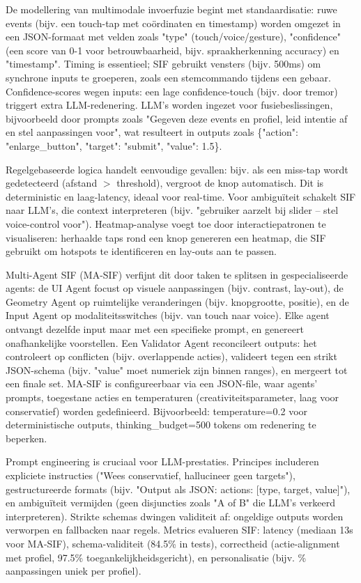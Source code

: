 \documentclass[openany]{book}
\begin{document}
De modellering van multimodale invoerfuzie begint met standaardisatie: ruwe events (bijv. een touch-tap met coördinaten en timestamp) worden omgezet in een JSON-formaat met velden zoals "type" (touch/voice/gesture), "confidence" (een score van 0-1 voor betrouwbaarheid, bijv. spraakherkenning accuracy) en "timestamp". Timing is essentieel; SIF gebruikt vensters (bijv. 500ms) om synchrone inputs te groeperen, zoals een stemcommando tijdens een gebaar. Confidence-scores wegen inputs: een lage confidence-touch (bijv. door tremor) triggert extra LLM-redenering. LLM's worden ingezet voor fusiebeslissingen, bijvoorbeeld door prompts zoals "Gegeven deze events en profiel, leid intentie af en stel aanpassingen voor", wat resulteert in outputs zoals \{"action": "enlarge\_button", "target": "submit", "value": 1.5\}.

Regelgebaseerde logica handelt eenvoudige gevallen: bijv. als een miss-tap wordt gedetecteerd (afstand $>$ threshold), vergroot de knop automatisch. Dit is deterministic en laag-latency, ideaal voor real-time. Voor ambiguïteit schakelt SIF naar LLM's, die context interpreteren (bijv. "gebruiker aarzelt bij slider – stel voice-control voor"). Heatmap-analyse voegt toe door interactiepatronen te visualiseren: herhaalde taps rond een knop genereren een heatmap, die SIF gebruikt om hotspots te identificeren en lay-outs aan te passen.

Multi-Agent SIF (MA-SIF) verfijnt dit door taken te splitsen in gespecialiseerde agents: de UI Agent focust op visuele aanpassingen (bijv. contrast, lay-out), de Geometry Agent op ruimtelijke veranderingen (bijv. knopgrootte, positie), en de Input Agent op modaliteitsswitches (bijv. van touch naar voice). Elke agent ontvangt dezelfde input maar met een specifieke prompt, en genereert onafhankelijke voorstellen. Een Validator Agent reconcileert outputs: het controleert op conflicten (bijv. overlappende acties), valideert tegen een strikt JSON-schema (bijv. "value" moet numeriek zijn binnen ranges), en mergeert tot een finale set. MA-SIF is configureerbaar via een JSON-file, waar agents' prompts, toegestane acties en temperaturen (creativiteitsparameter, laag voor conservatief) worden gedefinieerd. Bijvoorbeeld: temperature=0.2 voor deterministische outputs, thinking\_budget=500 tokens om redenering te beperken.

Prompt engineering is cruciaal voor LLM-prestaties. Principes includeren expliciete instructies ("Wees conservatief, hallucineer geen targets"), gestructureerde formats (bijv. "Output als JSON: {actions: [{type, target, value}]}"), en ambiguïteit vermijden (geen disjuncties zoals "A of B" die LLM's verkeerd interpreteren). Strikte schemas dwingen validiteit af: ongeldige outputs worden verworpen en fallbacken naar regels. Metrics evalueren SIF: latency (mediaan 13s voor MA-SIF), schema-validiteit (84.5\% in tests), correctheid (actie-alignment met profiel, 97.5\% toegankelijkheidsgericht), en personalisatie (bijv. \% aanpassingen uniek per profiel).
\end{document}
